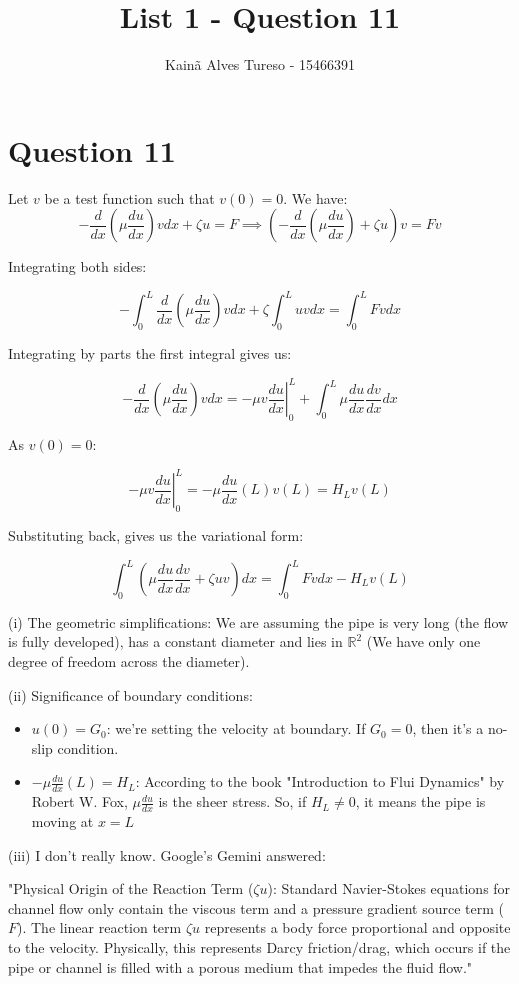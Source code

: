 \documentclass{article}
\title{List 1 - Question 11}
\author{Kainã Alves Tureso - 15466391}
\begin{document}
    \maketitle

    \section*{Question 11}
    Let $v$ be a test function such that $v(0) = 0$. We have:
    \begin{equation}
        - \frac{d}{dx} \left(\mu \frac{du}{dx}\right)vdx + \zeta u = F \implies \left( -\frac{d}{dx}\left(\mu \frac{du}{dx}\right) + \zeta u\right) v = Fv
    \end{equation}

    Integrating both sides:

    \[
        - \int_{0}^{L} \frac{d}{dx} \left(\mu \frac{du}{dx}\right)vdx + \zeta \int_{0}^{L} uv dx = \int_{0}^{L}Fvdx
    \]

    Integrating by parts the first integral gives us:

    \[
        - \frac{d}{dx} \left(\mu \frac{du}{dx}\right)vdx = -\mu v \left. \frac{du}{dx}\right|_0^L + \int_{0}^{L}\mu \frac{du}{dx} \frac{dv}{dx} dx
    \]

    As $v(0) = 0$:

    \[
        -\mu v \left. \frac{du}{dx}\right|_0^L = - \mu \frac{du}{dx}(L) v(L) = H_L v(L)
    \]

    Substituting back, gives us the variational form:

    \begin{equation}
        \int_{0}^{L}\left( \mu \frac{du}{dx} \frac{dv}{dx} + \zeta uv\right) dx = \int_{0}^{L}Fvdx - H_L v(L)
    \end{equation}

    (i) The geometric simplifications: We are assuming the pipe is very long (the flow is fully developed), has a constant diameter and lies in $\mathbb{R}^2$ (We have only one degree of freedom across the diameter).

    (ii) Significance of boundary conditions:
    \begin{itemize}
        \item $u(0) = G_0$: we're setting the velocity at boundary. If $G_0 = 0$, then it's a no-slip condition.
        \item $-\mu \frac{du}{dx}(L) = H_L$: According to the book "Introduction to Flui Dynamics" by Robert W. Fox, $\mu \frac{du}{dx}$ is the sheer stress. So, if $H_L \ne 0$, it means the pipe is moving at $x = L$
    \end{itemize}

    (iii) I don't really know. Google's Gemini answered:

    "Physical Origin of the Reaction Term ($\zeta u$): Standard Navier-Stokes equations for channel flow only contain the viscous term and a pressure gradient source term ($F$). The linear reaction term $\zeta u$ represents a body force proportional and opposite to the velocity. Physically, this represents Darcy friction/drag, which occurs if the pipe or channel is filled with a porous medium that impedes the fluid flow."
\end{document}
